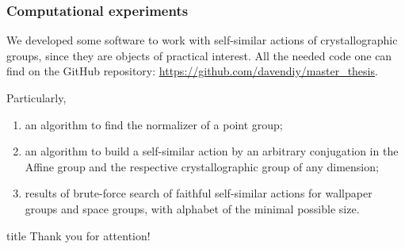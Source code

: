 \documentclass[notheorems,handout,san serif,hyperref={unicode}]{beamer} %
\theoremstyle{definition}
\begin{document}
\begin{frame}
	\frametitle{Computational experiments}
	
	We developed some software to work with self-similar actions of crystallographic groups, since they are objects of practical interest. All the needed code one can find on the GitHub repository: \href{https://github.com/davendiy/master_thesis}{https://github.com/davendiy/master\_thesis}. 
	
	Particularly,
	
	\begin{enumerate}
		\item an algorithm to find the normalizer of a  point group;
		\item an algorithm to build a self-similar action by an arbitrary conjugation in the Affine group and the respective crystallographic group of any dimension; 
		
		\item results of brute-force search of faithful self-similar actions for wallpaper groups and space groups, with alphabet of the minimal possible size.
		
	\end{enumerate}
	
\end{frame}

\begin{frame}
	\vfill
	\centering
	\begin{beamercolorbox}[sep=8pt,center,shadow=true,rounded=true]{title}
		 Thank you for attention!
	\end{beamercolorbox}
	\vfill
\end{frame}
\end{document}
